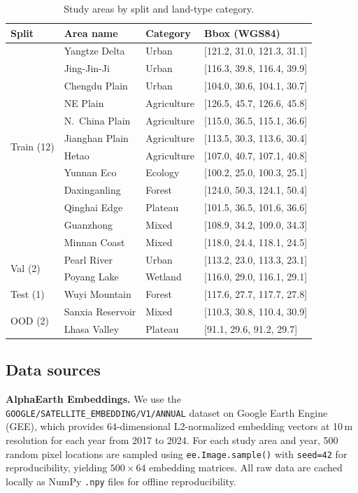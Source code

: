 \documentclass{article}
\begin{document}
\begin{table}[htbp]
\centering
\caption{Study areas by split and land-type category.}
\label{tab:areas}
\begin{tabular}{llll}
\toprule
Split & Area name & Category & Bbox (WGS84) \\
\midrule
\multirow{12}{*}{Train (12)} & Yangtze Delta & Urban & [121.2, 31.0, 121.3, 31.1] \\
 & Jing-Jin-Ji & Urban & [116.3, 39.8, 116.4, 39.9] \\
 & Chengdu Plain & Urban & [104.0, 30.6, 104.1, 30.7] \\
 & NE Plain & Agriculture & [126.5, 45.7, 126.6, 45.8] \\
 & N.~China Plain & Agriculture & [115.0, 36.5, 115.1, 36.6] \\
 & Jianghan Plain & Agriculture & [113.5, 30.3, 113.6, 30.4] \\
 & Hetao & Agriculture & [107.0, 40.7, 107.1, 40.8] \\
 & Yunnan Eco & Ecology & [100.2, 25.0, 100.3, 25.1] \\
 & Daxinganling & Forest & [124.0, 50.3, 124.1, 50.4] \\
 & Qinghai Edge & Plateau & [101.5, 36.5, 101.6, 36.6] \\
 & Guanzhong & Mixed & [108.9, 34.2, 109.0, 34.3] \\
 & Minnan Coast & Mixed & [118.0, 24.4, 118.1, 24.5] \\
\midrule
\multirow{2}{*}{Val (2)} & Pearl River & Urban & [113.2, 23.0, 113.3, 23.1] \\
 & Poyang Lake & Wetland & [116.0, 29.0, 116.1, 29.1] \\
\midrule
Test (1) & Wuyi Mountain & Forest & [117.6, 27.7, 117.7, 27.8] \\
\midrule
\multirow{2}{*}{OOD (2)} & Sanxia Reservoir & Mixed & [110.3, 30.8, 110.4, 30.9] \\
 & Lhasa Valley & Plateau & [91.1, 29.6, 91.2, 29.7] \\
\bottomrule
\end{tabular}
\end{table}

\subsection{Data sources}

\textbf{AlphaEarth Embeddings.} We use the \texttt{GOOGLE/SATELLITE\_EMBEDDING/V1/ANNUAL} dataset on Google Earth Engine (GEE), which provides 64-dimensional L2-normalized embedding vectors at 10\,m resolution for each year from 2017 to 2024. For each study area and year, 500 random pixel locations are sampled using \texttt{ee.Image.sample()} with \texttt{seed=42} for reproducibility, yielding $500\times64$ embedding matrices. All raw data are cached locally as NumPy \texttt{.npy} files for offline reproducibility.
\end{document}

